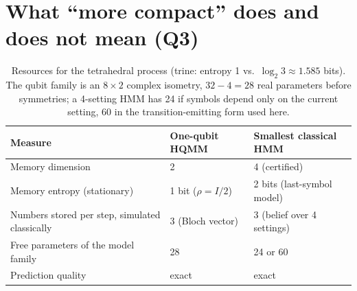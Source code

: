 \documentclass[11pt]{article}
\begin{document}
\section{What ``more compact'' does and does not mean (Q3)}\label{sec:resources}

\begin{table}[h]
\centering\footnotesize
\begin{tabular}{lll}
\toprule
Measure & One-qubit HQMM & Smallest classical HMM \\
\midrule
Memory dimension & 2 & 4 (certified) \\
Memory entropy (stationary) & 1 bit ($\rho=I/2$) & 2 bits (last-symbol model) \\
Numbers stored per step, simulated classically & 3 (Bloch vector) & 3 (belief over 4 settings) \\
Free parameters of the model family & 28 & 24 or 60 \\
Prediction quality & exact & exact \\
\bottomrule
\end{tabular}
\caption{Resources for the tetrahedral process (trine: entropy 1 vs.\ $\log_2 3\approx1.585$ bits). The qubit family is an $8\times2$ complex isometry, $32-4=28$ real parameters before symmetries; a 4-setting HMM has 24 if symbols depend only on the current setting, 60 in the transition-emitting form used here.}
\label{tab:resources}
\end{table}
\end{document}
